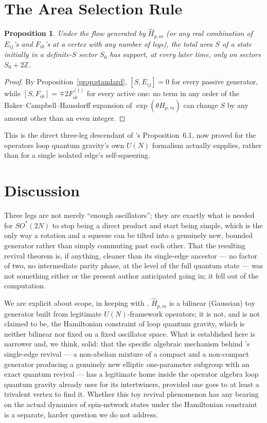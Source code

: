 \documentclass[11pt]{amsart}
\newtheorem{proposition}[theorem]{Proposition}
\theoremstyle{remark}
\begin{document}
\section{The Area Selection Rule}

\begin{proposition}\label{prop:selection}
Under the flow generated by $\hat H_{p,m}$ (or any real combination of $E_{ij}$'s and $F_{ik}$'s at a vertex with any number of legs), the total area $S$ of a state initially in a definite-$S$ sector $S_0$ has support, at every later time, only on sectors $S_0+2\mathbb Z$.
\end{proposition}
\begin{proof}
By Proposition~\ref{prop:standard}, $[S,E_{ij}]=0$ for every passive generator, while $[S,F_{ik}]=\mp2F_{ik}^{(\dagger)}$ for every active one: no term in any order of the Baker--Campbell--Hausdorff expansion of $\exp(\theta\hat H_{p,m})$ can change $S$ by any amount other than an even integer.
\end{proof}

This is the direct three-leg descendant of \cite{QuantumRealizations}'s Proposition~6.1, now proved for the operators loop quantum gravity's own $U(N)$ formalism actually supplies, rather than for a single isolated edge's self-squeezing.

\section{Discussion}

Three legs are not merely ``enough oscillators''; they are exactly what is needed for $SO^*(2N)$ to stop being a direct product and start being simple, which is the only way a rotation and a squeeze can be tilted into a genuinely new, bounded generator rather than simply commuting past each other. That the resulting revival theorem is, if anything, cleaner than its single-edge ancestor --- no factor of two, no intermediate parity phase, at the level of the full quantum state --- was not something either \cite{QuantumRealizations} or the present author anticipated going in; it fell out of the computation.

We are explicit about scope, in keeping with \cite{QuantumRealizations,EigenCoordinates,ConicTheorem}. $\hat H_{p,m}$ is a bilinear (Gaussian) toy generator built from legitimate $U(N)$-framework operators; it is not, and is not claimed to be, the Hamiltonian constraint of loop quantum gravity, which is neither bilinear nor fixed on a fixed oscillator space. What is established here is narrower and, we think, solid: that the specific algebraic mechanism behind \cite{QuantumRealizations}'s single-edge revival --- a non-abelian mixture of a compact and a non-compact generator producing a genuinely new elliptic one-parameter subgroup with an exact quantum revival --- has a legitimate home inside the operator algebra loop quantum gravity already uses for its intertwiners, provided one goes to at least a trivalent vertex to find it. Whether this toy revival phenomenon has any bearing on the actual dynamics of spin-network states under the Hamiltonian constraint is a separate, harder question we do not address.
\end{document}
